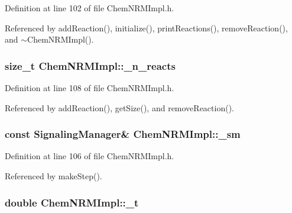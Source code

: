 Definition at line 102 of file Chem\-N\-R\-M\-Impl.\-h.



Referenced by add\-Reaction(), initialize(), print\-Reactions(), remove\-Reaction(), and $\sim$\-Chem\-N\-R\-M\-Impl().

\hypertarget{classChemNRMImpl_acbb18690cfdd71dd4be01747aaf169d0}{
\subsubsection[{\-\_\-n\-\_\-reacts}]{\setlength{\rightskip}{0pt plus 5cm}size\-\_\-t {\bf Chem\-N\-R\-M\-Impl\-::\-\_\-n\-\_\-reacts}}}\label{classChemNRMImpl_acbb18690cfdd71dd4be01747aaf169d0}


Definition at line 108 of file Chem\-N\-R\-M\-Impl.\-h.



Referenced by add\-Reaction(), get\-Size(), and remove\-Reaction().

\hypertarget{classChemNRMImpl_ab1afd752876c0e135341498d963e730a}{
\subsubsection[{\-\_\-sm}]{\setlength{\rightskip}{0pt plus 5cm}const {\bf Signaling\-Manager}\& {\bf Chem\-N\-R\-M\-Impl\-::\-\_\-sm}}}\label{classChemNRMImpl_ab1afd752876c0e135341498d963e730a}


Definition at line 106 of file Chem\-N\-R\-M\-Impl.\-h.



Referenced by make\-Step().

\hypertarget{classChemNRMImpl_a87649ab485a12e3af036913033ee7ca2}{
\subsubsection[{\-\_\-t}]{\setlength{\rightskip}{0pt plus 5cm}double {\bf Chem\-N\-R\-M\-Impl\-::\-\_\-t}}}\label{classChemNRMImpl_a87649ab485a12e3af036913033ee7ca2}


